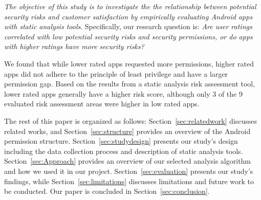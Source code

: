 \documentclass{sig-alternate}
\newcommand{\todo}[1]{\textcolor{cyan}{\textbf{[#1]}}}
\begin{document}




\emph{The objective of this study is to investigate the the relationship between potential security risks and customer satisfaction by empirically evaluating Android apps with static analysis tools}. Specifically, our research question is: \textit{Are user ratings correlated with low potential security risks and security permissions, or do apps with higher ratings have more security risks?}


We found that while lower rated apps requested more permissions, higher rated apps did not adhere to the principle of least privilege and have a larger permission gap. Based on the results from a static analysis risk assessment tool, lower rated apps generally have a higher risk score, although only 3 of the 9 evaluated risk assessment areas were higher in low rated apps.




The rest of this paper is organized as follows: Section~\ref{sec:relatedwork} discusses related works, and Section~\ref{sec:structure} provides an overview of the Android permission structure. Section~\ref{sec:studydesign} presents our study's design including the data collection process and description of static analysis tools. Section~\ref{sec:Approach} provides an overview of our selected analysis algorithm and how we used it in our project. Section~\ref{sec:evaluation} presents our study's findings, while Section~\ref{sec:limitations} discusses limitations and future work to be conducted. Our paper is concluded in Section~\ref{sec:conclusion}.
\end{document}
